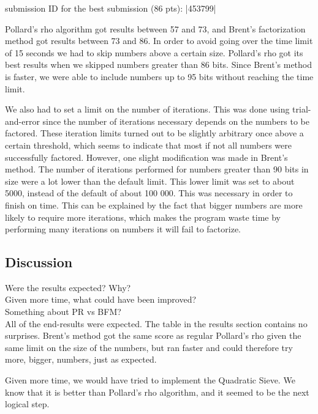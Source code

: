 \documentclass[paper=a4, fontsize=11pt,numbers=endperiod]{scrartcl} %
\numberwithin{equation}{section} %
\numberwithin{figure}{section} %
\numberwithin{table}{section} %
\begin{document}
    submission ID for the best submission (86 pts): |453799|

Pollard's rho algorithm got results between 57 and 73, and Brent's factorization method got results between 73 and 86.
In order to avoid going over the time limit of 15 seconds we had to skip numbers above a certain size. Pollard's rho got its best results when we skipped numbers greater than 86 bits. Since Brent's method is faster, we were able to include numbers up to 95 bits without reaching the time limit. 

We also had to set a limit on the number of iterations. This was done using trial-and-error since the number of iterations necessary depends on the numbers to be factored. These iteration limits turned out to be slightly arbitrary once above a certain threshold, which seems to indicate that most if not all numbers were successfully factored. However, one slight modification was made in Brent's method. The number of iterations performed for numbers greater than 90 bits in size were a lot lower than the default limit. This lower limit was set to about 5000, instead of the default of about 100 000. This was necessary in order to finish on time. This can be explained by the fact that bigger numbers are more likely to require more iterations, which makes the program waste time by performing many iterations on numbers it will fail to factorize.


\subsection{Discussion}
Were the results expected? Why?\\
Given more time, what could have been improved?\\
Something about PR vs BFM?\\

All of the end-results were expected. The table in the results section contains no surprises.
Brent's method got the same score as regular Pollard's rho given the same limit on the size of the numbers, but ran faster and could therefore try more, bigger, numbers, just as expected.


Given more time, we would have tried to implement the Quadratic Sieve. We know that it is better than Pollard's rho algorithm, and it seemed to be the next logical step. 
\end{document}
